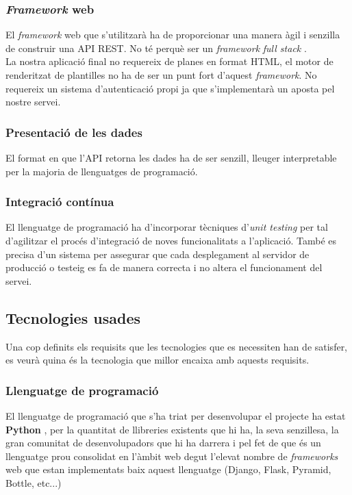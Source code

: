 	
	\subsubsection{\emph{Framework} web}
	El \emph{framework} web que s'utilitzarà ha de proporcionar una manera àgil i senzilla de construir una \ac{API} \ac{REST}. No té perquè ser un \emph{framework} \emph{full stack} \cite{web_framework}.\\
	
	 La nostra aplicació final no requereix de planes en format \ac{HTML}, el motor de renderitzat de plantilles no ha de ser un punt fort d'aquest \emph{framework}. No requereix un sistema d'autenticació propi ja que s'implementarà un aposta pel nostre servei.
	
	\subsubsection{Presentació de les dades}
	El format en que l'\ac{API} retorna les dades ha de ser senzill, lleuger interpretable per la majoria de llenguatges de programació.\\

	\subsubsection{Integració contínua}
	El llenguatge de programació ha d'incorporar tècniques d'\emph{unit testing} per tal d'agilitzar el procés d'integració de noves funcionalitats a l'aplicació. També es precisa d'un sistema per assegurar que cada desplegament al servidor de producció o testeig es fa de manera correcta i no altera el funcionament del servei.

\subsection{Tecnologies usades}
Una cop definits els requisits que les tecnologies que es necessiten han de satisfer, es veurà quina és la tecnologia que millor encaixa amb aquests requisits.

	\subsubsection{Llenguatge de programació}
	El llenguatge de programació que s'ha triat per desenvolupar el projecte ha estat \textbf{Python} \cite{python}, per la quantitat de llibreries existents que hi ha, la seva senzillesa, la gran comunitat de desenvolupadors que hi ha darrera i pel fet de que és un llenguatge prou consolidat en l'àmbit web degut l'elevat nombre de \emph{frameworks} web que estan implementats baix aquest llenguatge (Django, Flask, Pyramid, Bottle, etc...)

